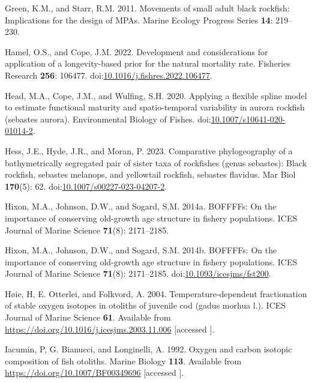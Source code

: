 \documentclass[11pt,
  english,
  letterpaper,
]{article}
\newlength{\cslhangindent}
\newenvironment{CSLReferences}[2] %
 {%
  \setlength{\parindent}{0pt}
  \ifodd #1 \everypar{\setlength{\hangindent}{\cslhangindent}}\ignorespaces\fi
  \ifnum #2 > 0
  \setlength{\parskip}{#2\baselineskip}
  \fi
 }%
 {}
\begin{document}
\begin{CSLReferences}{1}{0}
\leavevmode{}%
Green, K.M., and Starr, R.M. 2011. Movements of small adult black rockfish: Implications for the design of MPAs. Marine Ecology Progress Series \textbf{14}: 219--230.

\leavevmode{}%
Hamel, O.S., and Cope, J.M. 2022. Development and considerations for application of a longevity-based prior for the natural mortality rate. Fisheries Research \textbf{256}: 106477. doi:\href{https://doi.org/10.1016/j.fishres.2022.106477}{10.1016/j.fishres.2022.106477}.

\leavevmode{}%
Head, M.A., Cope, J.M., and Wulfing, S.H. 2020. Applying a flexible spline model to estimate functional maturity and spatio-temporal variability in aurora rockfish (sebastes aurora). Environmental Biology of Fishes. doi:\href{https://doi.org/10.1007/s10641-020-01014-2}{10.1007/s10641-020-01014-2}.

\leavevmode{}%
Hess, J.E., Hyde, J.R., and Moran, P. 2023. Comparative phylogeography of a bathymetrically segregated pair of sister taxa of rockfishes (genus sebastes): Black rockfish, sebastes melanops, and yellowtail rockfish, sebastes flavidus. Mar Biol \textbf{170}(5): 62. doi:\href{https://doi.org/10.1007/s00227-023-04207-2}{10.1007/s00227-023-04207-2}.

\leavevmode{}%
Hixon, M.A., Johnson, D.W., and Sogard, S.M. 2014a. BOFFFFs: On the importance of conserving old-growth age structure in fishery populations. ICES Journal of Marine Science \textbf{71}(8): 2171--2185.

\leavevmode{}%
Hixon, M.A., Johnson, D.W., and Sogard, S.M. 2014b. {BOFFFFs}: On the importance of conserving old-growth age structure in fishery populations. {ICES} Journal of Marine Science \textbf{71}(8): 2171--2185. doi:\href{https://doi.org/10.1093/icesjms/fst200}{10.1093/icesjms/fst200}.

\leavevmode{}%
Høie, H, E. Otterlei, and Folkvord, A. 2004. Temperature-dependent fractionation of stable oxygen isotopes in otoliths of juvenile cod (gadus morhua l.). ICES Journal of Marine Science \textbf{61}. Available from \url{https://doi.org/10.1016/j.icesjms.2003.11.006} {[}accessed {]}.

\leavevmode{}%
Iacumin, P, G. Bianucci, and Longinelli, A. 1992. Oxygen and carbon isotopic composition of fish otoliths. Marine Biology \textbf{113}. Available from \url{https://doi.org/10.1007/BF00349696} {[}accessed {]}.


\end{CSLReferences}
\end{document}

